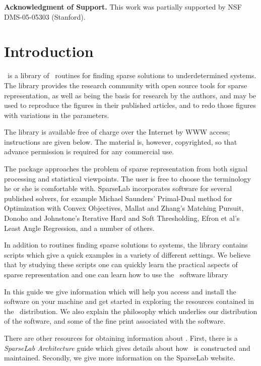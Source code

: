 \documentclass{article}
\begin{document}
{\bf Acknowledgment of Support.} This work was partially supported
by NSF DMS-05-05303 (Stanford).

\pagebreak

\tableofcontents

\pagebreak

\section{Introduction}

\WaveLab\ is a library of \Matlab\ routines for finding sparse solutions to underdetermined
systems. The library provides the research community with open source tools for sparse
representation, as well as being the basis for research by the authors, and may be used to
reproduce the figures in their published articles, and to redo those figures with variations in the
parameters.

The library is available free of charge over the Internet by WWW access; instructions are given
below.  The material is, however, copyrighted, so that advance permission is required for any
commercial use.

The package approaches the problem of sparse representation from both signal processing and
statistical viewpoints. The user is free to choose the terminology he or she is comfortable with.
SparseLab incorporates software for several published solvers, for example Michael Saunders'
Primal-Dual method for Optimization with Convex Objectives, Mallat and Zhang's Matching Pursuit,
Donoho and Johnstone's Iterative Hard and Soft Thresholding, Efron et al's Least Angle Regression,
and a number of others.

In addition to routines finding sparse solutions to systems, the library contains scripts which
give a quick examples in a variety of different settings. We believe that by studying these scripts
one can quickly learn the practical aspects of sparse representation and one can learn how to use
the \WaveLab\ software library

In this guide we give information which will help you access and install the software on your
machine and get started in exploring the resources contained in the \WaveLab\ distribution. We also
explain the philosophy which underlies our distribution of the software, and some of the fine print
associated with the software.

There are other resources for obtaining information about \WaveLab. First, there is a {\it
SparseLab Architecture} guide which gives details about how \WaveLab\ is constructed and
maintained. Secondly, we give more information on the SparseLab website.
\end{document}
